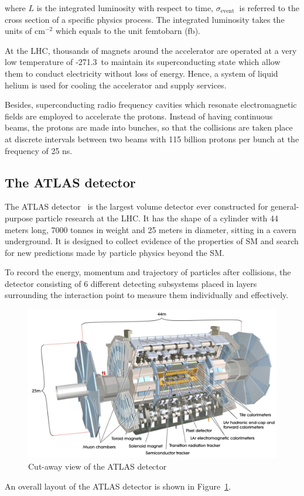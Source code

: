 \documentclass[UTF8,12pt]{ctexart}
\numberwithin{equation}{section}
\begin{document}
where $L$ is the integrated luminosity with respect to time, $\sigma_{\text {event }}$ is referred to the cross section of a specific physics process. The integrated luminosity takes the units of cm$^{-2}$ which equals to the unit femtobarn (fb).

 At the LHC, thousands of magnets around the accelerator are operated at a very low temperature of ‑271.3\textcelsius \ to maintain its superconducting state which allow them to conduct electricity without loss of energy. Hence, a system of liquid helium is used for cooling the accelerator and supply services.

Besides, superconducting radio frequency cavities which resonate electromagnetic fields are employed to accelerate the protons. Instead of having continuous beams, the protons are made into bunches, so that the collisions are taken place at discrete intervals between two beams with 115 billion protons per bunch at the frequency of 25 ns.


\subsection{The ATLAS detector}
\label{sec:3.2}

The ATLAS detector~\cite{PERF-2007-01} is the largest volume detector ever constructed for general-purpose particle research at the LHC. It has the shape of a cylinder with 44 meters long, 7000 tonnes in weight and 25 meters in diameter, sitting in a cavern underground. It is designed to collect evidence of the properties of SM and search for new predictions made by particle physics beyond the SM.

To record the energy, momentum and trajectory of particles after collisions, the detector consisting of 6 different detecting subsystems  placed in layers surrounding the interaction point to measure them individually and effectively. 

 \begin{figure}[htb] 
	\centering  
	\includegraphics[width=16cm]{./fig/atlas.png}
	\caption{Cut-away view of the ATLAS detector}
	\label{Fig.atlas}
\end{figure}
An overall layout of the ATLAS detector is shown in Figure~\ref{Fig.atlas}.
\end{document}
